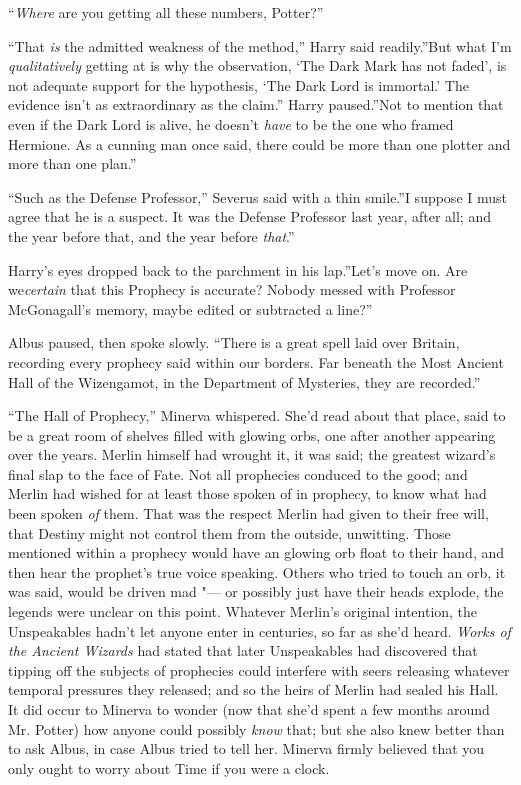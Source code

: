 ``\emph{Where} are you getting all these numbers, Potter?''

``That \emph{is} the admitted weakness of the method,'' Harry said
readily.''But what I'm \emph{qualitatively} getting at is why the
observation, `The Dark Mark has not faded', is not adequate support for
the hypothesis, `The Dark Lord is immortal.' The evidence isn't as
extraordinary as the claim.'' Harry paused.''Not to mention that even if
the Dark Lord is alive, he doesn't \emph{have} to be the one who framed
Hermione. As a cunning man once said, there could be more than one
plotter and more than one plan.''

``Such as the Defense Professor,'' Severus said with a thin smile.''I
suppose I must agree that he is a suspect. It was the Defense Professor
last year, after all; and the year before that, and the year before
\emph{that}.''

Harry's eyes dropped back to the parchment in his lap.''Let's move on.
Are we\emph{certain} that this Prophecy is accurate? Nobody messed with
Professor McGonagall's memory, maybe edited or subtracted a line?''

Albus paused, then spoke slowly. ``There is a great spell laid over
Britain, recording every prophecy said within our borders. Far beneath
the Most Ancient Hall of the Wizengamot, in the Department of Mysteries,
they are recorded.''

``The Hall of Prophecy,'' Minerva whispered. She'd read about that
place, said to be a great room of shelves filled with glowing orbs, one
after another appearing over the years. Merlin himself had wrought it,
it was said; the greatest wizard's final slap to the face of Fate. Not
all prophecies conduced to the good; and Merlin had wished for at least
those spoken of in prophecy, to know what had been spoken \emph{of}
them. That was the respect Merlin had given to their free will, that
Destiny might not control them from the outside, unwitting. Those
mentioned within a prophecy would have an glowing orb float to their
hand, and then hear the prophet's true voice speaking. Others who tried
to touch an orb, it was said, would be driven mad "--- or possibly just
have their heads explode, the legends were unclear on this point.
Whatever Merlin's original intention, the Unspeakables hadn't let anyone
enter in centuries, so far as she'd heard. \emph{Works of the Ancient
Wizards} had stated that later Unspeakables had discovered that tipping
off the subjects of prophecies could interfere with seers releasing
whatever temporal pressures they released; and so the heirs of Merlin
had sealed his Hall. It did occur to Minerva to wonder (now that she'd
spent a few months around Mr. Potter) how anyone could possibly
\emph{know} that; but she also knew better than to ask Albus, in case
Albus tried to tell her. Minerva firmly believed that you only ought to
worry about Time if you were a clock.

